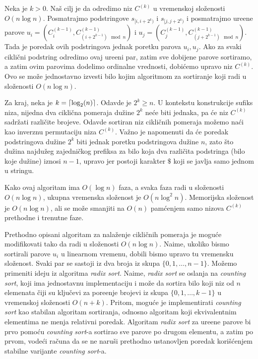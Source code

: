 Neka je $k>0$. Na\v s cilj je da odredimo niz $C^{(k)}$ u vremenskoj slo\v zenosti $O(n \log n)$. Posmatrajmo podstringove $s_{[i, i+2^k)}$ i $s_{[j, j+2^k)}$ i posmatrajmo ure\dj ene parove $u_i = (C^{(k-1)}_i, C^{(k-1)}_{(i+2^{k-1}) \mod n })$ i $u_j = (C^{(k-1)}_j, C^{(k-1)}_{(j+2^{k-1}) \mod n })$. Tada je poredak ovih podstringova jednak poretku parova $u_i, u_j$. Ako za svaki cikli\v cni podstring odredimo ovaj ure\dj eni par, zatim sve dobijene parove sortiramo, a zatim ovim parovima dodelimo ordinalne vrednosti, dobi\' cemo upravo niz $C^{(k)}$. Ovo se mo\v ze jednostavno izvesti bilo kojim algoritmom za sortiranje koji radi u slo\v zenosti $O(n \log n)$.

Za kraj, neka je $k = \left \lceil \log_2(n) \right \rceil$. Odavde je $2^k \geq n$. U kontekstu konstrukcije sufiks niza, nijedna dva cikli\v cna pomeraja du\v zine $2^k$ ne\' ce biti jednaka, pa \' ce niz $C^{(k)}$ sadr\v zati razli\v cite brojeve. Odavde sortiran niz cikli\v cnih pomeraja mo\v zemo na\' ci kao inverznu permutaciju niza $C^{(k)}$. Va\v zno je napomenuti da \' ce poredak podstringova du\v zine $2^k$ biti jednak poretku podstringova du\v zine $n$, zato \v sto du\v zina najdu\v zeg zajedni\v ckog prefiksa za bilo koja dva razli\v cita podstringa (bilo koje du\v zine) iznosi $n-1$, upravo jer postoji karakter $\$$ koji se javlja samo jednom u stringu.

Kako ovaj algoritam ima $O(\log n)$ faza, a svaka faza radi u slo\v zenosti $O(n \log n)$, ukupna vremenska slo\v zenost je $O(n \log^2 n)$. Memorijska slo\v zenost je $O(n \log n)$, ali se mo\v ze smanjiti na $O(n)$ pam\' cenjem samo nizova $C^{(k)}$ prethodne i trenutne faze.

\noindent
\begin{minipage}[l]{\textwidth}

\end{minipage}

Prethodno opisani algoritam za nala\v zenje cikli\v cnih pomeraja je mogu\' ce modifikovati tako da radi u slo\v zenosti $O(n \log n)$. Naime, ukoliko bismo sortirali parove $u_i$ u linearnom vremenu, dobili bismo upravo tu vremensku slo\v zenost. Svaki par se sastoji iz dva broja iz skupa $\{0, 1, \ldots, n-1\}$. Mo\v zemo primeniti ideju iz algoritma \textit{radix sort}. Naime, \textit{radix sort} se oslanja na \textit{counting sort}, koji ima jednostavnu implementaciju i mo\v ze da sortira bilo koji niz od $n$ elemenata \v ciji su klju\v cevi za pore\dj enje brojevi iz skupa $\{0, 1, \ldots, k-1\}$ u vremenskoj slo\v zenosti $O(n+k)$. Pritom, mogu\' ce je implementirati \textit{counting sort} kao stabilan algoritam sortiranja, odnosno algoritam koji ekvivalentnim elementima ne menja relativni poredak. Algoritam \textit{radix sort} za ure\dj ene parove bi prvo pomo\' cu \textit{counting sort}-a sortirao sve parove po drugom elementu, a zatim po prvom, vode\' ci ra\v cuna da se ne naru\v si prethodno ustanovljen poredak kori\v s\' cenjem stabilne varijante \textit{counting sort}-a.

